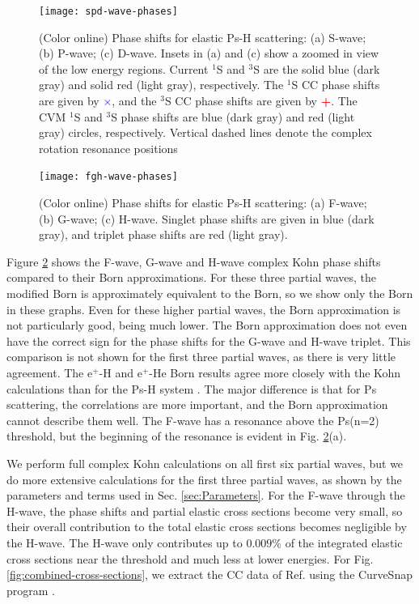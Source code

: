 \documentclass[preprint,showpacs,preprintnumbers,amsmath,amssymb,longbibliography,pra,aps]{revtex4-1}
\begin{document}
\begin{figure}[H]
	\centering
	\texttt{[image: spd-wave-phases]}
	\caption{(Color online) Phase shifts for elastic Ps-H scattering: (a) S-wave; (b) P-wave; (c) D-wave. Insets in (a) and (c) show a zoomed in view of the low energy regions. Current $^1$S and $^3$S are the solid blue (dark gray) and solid red (light gray), respectively. The $^1$S CC phase shifts \cite{Walters2004} are given by \mbox{\textcolor{blue}{$\times$}}, and the $^3$S CC phase shifts \cite{Blackwood2002} are given by \mbox{\textcolor{red}{\textbf{+}}}. The CVM $^1$S and $^3$S phase shifts \cite{Zhang2012} are blue (dark gray) and red (light gray) circles, respectively. Vertical dashed lines denote the complex rotation resonance positions \cite{Yan1999,Yan1998a,Ho1998}}
	\label{fig:spd-wave-phases}
\end{figure}

\begin{figure}[H]
	\centering
	\texttt{[image: fgh-wave-phases]}
	\caption{(Color online) Phase shifts for elastic Ps-H scattering: (a) F-wave; (b) G-wave; (c) H-wave. Singlet phase shifts are given in blue (dark gray), and triplet phase shifts are red (light gray).}
	\label{fig:fgh-wave-phases}
\end{figure}

Figure \ref{fig:fgh-wave-phases} shows the F-wave, G-wave and H-wave complex Kohn phase shifts compared to their Born approximations. For these three partial waves, the modified Born is approximately equivalent to the Born, so we show only the Born in these graphs. Even for these higher partial waves, the Born approximation is not particularly good, being much lower. The Born approximation does not even have the correct sign for the phase shifts for the G-wave and H-wave triplet. This comparison is not shown for the first three partial waves, as there is very little agreement. The e$^+$-H and e$^+$-He Born results agree more closely with the Kohn calculations than for the Ps-H system \cite{VanReeth2014}. The major difference is that for Ps scattering, the correlations are more important, and the Born approximation cannot describe them well. The F-wave has a resonance above the Ps(n=2) threshold, but the beginning of the resonance is evident in Fig. \ref{fig:fgh-wave-phases}(a).

We perform full complex Kohn calculations on all first six partial waves, but we do more extensive calculations for the first three partial waves, as shown by the parameters and terms used in Sec. \ref{sec:Parameters}. For the F-wave through the H-wave, the phase shifts and partial elastic cross sections become very small, so their overall contribution to the total elastic cross sections becomes negligible by the H-wave. The H-wave only contributes up to $0.009\%$ of the integrated elastic cross sections near the threshold and much less at lower energies. For Fig. \ref{fig:combined-cross-sections}, we extract the CC data of Ref. \cite{Walters2004} using the CurveSnap program \cite{CurveSnap}.
\end{document}
